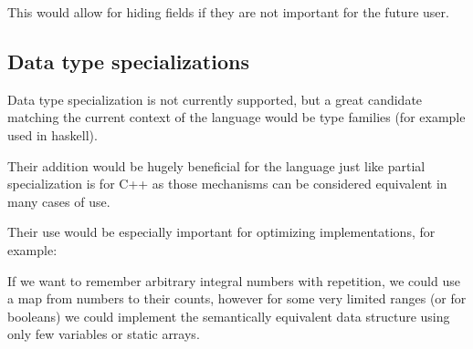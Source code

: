 This would allow for hiding fields if they are not important for the future user.

\subsection{Data type specializations}

Data type specialization is not currently supported, but a great candidate matching the current context of the language would be type families (for example used in haskell).

Their addition would be hugely beneficial for the language just like partial specialization is for C++ as those mechanisms can be considered equivalent in many cases of use.

Their use would be especially important for optimizing implementations, for example:

If we want to remember arbitrary integral numbers with repetition, we could use a map from numbers to their counts, however for some very limited ranges (or for booleans) we could implement the semantically equivalent data structure using only few variables or static arrays.

